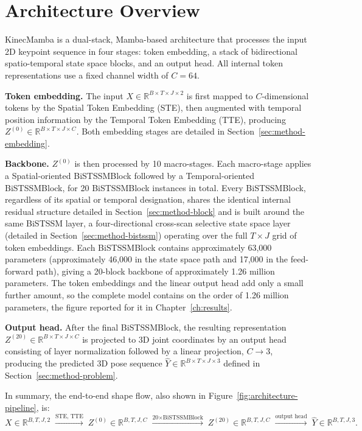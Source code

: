 \section{Architecture Overview}
\label{sec:method-architecture}

KinecMamba is a dual-stack, Mamba-based architecture that
processes the input 2D keypoint sequence in four stages: token embedding,
a stack of bidirectional spatio-temporal state space blocks, and an
output head. All internal token representations use a fixed channel width
of $C=64$.

\textbf{Token embedding.} The input $X \in \mathbb{R}^{B \times T \times J
\times 2}$ is first mapped to $C$-dimensional tokens by the Spatial Token
Embedding (STE), then augmented with temporal position information by the
Temporal Token Embedding (TTE), producing $Z^{(0)} \in \mathbb{R}^{B
\times T \times J \times C}$. Both embedding stages are detailed in
Section~\ref{sec:method-embedding}.

\textbf{Backbone.} $Z^{(0)}$ is then processed by 10 macro-stages. Each
macro-stage applies a Spatial-oriented BiSTSSMBlock followed by a
Temporal-oriented BiSTSSMBlock, for 20 BiSTSSMBlock instances in total.
Every BiSTSSMBlock, regardless of its spatial or temporal designation,
shares the identical internal residual structure detailed in
Section~\ref{sec:method-block} and is built around the same BiSTSSM layer,
a four-directional cross-scan selective state space layer (detailed in
Section~\ref{sec:method-bistssm}) operating over the full $T \times J$
grid of token embeddings. Each BiSTSSMBlock contains approximately 63,000
parameters (approximately 46,000 in the state space path and 17,000 in
the feed-forward path), giving a 20-block backbone of approximately 1.26
million parameters. The token embeddings and the linear output head add
only a small further amount, so the complete model contains on the order
of 1.26 million parameters, the figure reported for it in
Chapter~\ref{ch:results}.

\textbf{Output head.} After the final BiSTSSMBlock, the resulting
representation $Z^{(20)} \in \mathbb{R}^{B \times T \times J \times C}$ is
projected to 3D joint coordinates by an output head consisting of layer
normalization followed by a linear projection, $C \rightarrow 3$,
producing the predicted 3D pose sequence $\hat{Y} \in \mathbb{R}^{B \times
T \times J \times 3}$ defined in Section~\ref{sec:method-problem}.

In summary, the end-to-end shape flow, also shown in
Figure~\ref{fig:architecture-pipeline}, is:
\[
X \in \mathbb{R}^{B,T,J,2}
\;\xrightarrow{\text{STE, TTE}}\;
Z^{(0)} \in \mathbb{R}^{B,T,J,C}
\;\xrightarrow{\text{20} \times \text{BiSTSSMBlock}}\;
Z^{(20)} \in \mathbb{R}^{B,T,J,C}
\;\xrightarrow{\text{output head}}\;
\hat{Y} \in \mathbb{R}^{B,T,J,3}.
\]

